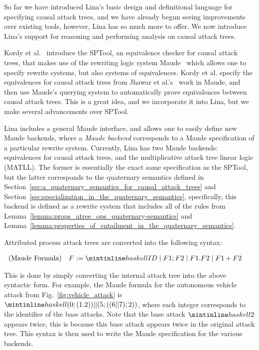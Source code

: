 So far we have introduced Lina's basic design and definitional
language for specifying causal attack trees, and we have already begun
seeing improvements over existing tools, however, Lina has so much
more to offer.  We now introduce Lina's support for reasoning and
performing analysis on causal attack trees.

Kordy et al.~\cite{Kordy2017} introduce the SPTool, an equivalence
checker for causal attack trees, that makes use of the rewriting logic
system Maude~\cite{clavel2005maude} which allows one to specify
rewrite systems, but also systems of equivalences.  Kordy et
al. specify the equivalences for causal attack trees from Jhawar et
al.'s~\cite{Jhawar:2015} work in Maude, and then use Maude's querying
system to automatically prove equivalences between causal attack
trees.  This is a great idea, and we incorporate it into Lina, but we
make several advancements over SPTool.

Lina includes a general Maude interface, and allows one to easily
define new Maude backends, where a \emph{Maude backend} corresponds to
a Maude specification of a particular rewrite system.  Currently, Lina
has two Maude backends: equivalences for causal attack trees, and the
multiplicative attack tree linear logic (MATLL).  The former is
essentially the exact same specification as the SPTool, but the latter
corresponds to the quaternary semantics defined in
Section~\ref{sec:a_quaternary_semantics_for_causal_attack_trees} and
Section~\ref{sec:specialization_in_the_quaternary_semantics},
specifically, this backend is defined as a rewrite system that
includes all of the rules from
Lemma~\ref{lemma:props_atree_ops_quaternary-semantics} and
Lemma~\ref{lemma:properties_of_entailment_in_the_quaternary_semantics}.

Attributed process attack trees are converted into the following
syntax:
\begin{center}
  \begin{math}
    \begin{array}{lll}
      \text{(Maude Formula)} & F := \mh{ID} \mid F1 ; F2 \mid F1.F2 \mid F1+F2
    \end{array}
  \end{math}
\end{center}
This is done by simply converting the internal attack tree into the
above syntactic form.  For example, the Maude formula for the
autonomous vehicle attack from Fig.~\ref{fig:vehicle_attack} is
$\mh{(0 ; (1 . 2)) || (5 ; ((6 || 7) ; 2))}$, where each integer
corresponds to the identifier of the base attacks.  Note that the base
attack $\mh{2}$ appears twice, this is because this base attack
appears twice in the original attack tree.  This syntax is then used
to write the Maude specification for the various backends.

